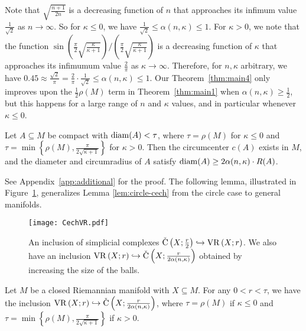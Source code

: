 \documentclass[11pt, reqno, english]{amsart}
\begin{document}
Note that $\sqrt{\tfrac{n+1}{2n}}$ is a decreasing function of $n$ that approaches its infimum value $\frac{1}{\sqrt{2}}$ as $n\to \infty$.
So for $\kappa\le 0$, we have $\frac{1}{\sqrt{2}}\le \alpha(n,\kappa)\le 1$.
For $\kappa> 0$, we note that the function $\sin\left(\tfrac{\pi}{2}\sqrt{\frac{\kappa}{\kappa+1}}\right)/\left(\tfrac{\pi}{2}\sqrt{\frac{\kappa}{\kappa+1}}\right)$ is a decreasing function of $\kappa$ that approaches its infimumum value $\frac{2}{\pi}$ as $\kappa\to\infty$.
Therefore, for $n,\kappa$ arbitrary, we have $0.45 \approx\frac{\sqrt{2}}{\pi}= \frac{2}{\pi}\cdot\frac{1}{\sqrt{2}} \le \alpha(n,\kappa)\le 1$.
Our Theorem~\ref{thm:main4} only improves upon the $\frac{1}{2}\rho(M)$ term in Theorem~\ref{thm:main1} when $\alpha(n,\kappa) \ge \frac{1}{2}$, but this happens for a large range of $n$ and $\kappa$ values, and in particular whenever $\kappa\le 0$.

\vspace{3mm}
\begin{lemma}[Circumradius]
\label{lem:circum}
Let $A\subseteq M$ be compact with $\mathrm{diam}(A)< \tau$, where $\tau=\rho(M)$ for $\kappa\le 0$ and $\tau=\min\left\{\rho(M),\tfrac{\pi}{2\sqrt{\kappa+1}}\right\}$ for $\kappa>0$.
Then the circumcenter $c(A)$ exists in $M$, and the diameter and circumradius of $A$ satisfy
$\mathrm{diam}(A)\geq2\alpha(n,\kappa)\cdot R(A)$.
\end{lemma}
\vspace{3mm}

See Appendix~\ref{app:additional} for the proof.
The following lemma, illustrated in Figure~\ref{fig:rips-cech-interleaving}, generalizes Lemma \ref{lem:circle-cech} from the circle case to general manifolds.

\begin{figure}[htb]
\centering
\texttt{[image: CechVR.pdf]}
\caption{An inclusion of simplicial complexes 
$\mathrm{\check{C}}\left(X;\frac{r}{2}\right)\hookrightarrow\mathrm{VR}\left(X;r\right)$.
We also have an inclusion $\mathrm{VR}\left(X;r\right)\hookrightarrow\mathrm{\check{C}}\left(X;\tfrac{r}{2\alpha(n,\kappa)}\right)$ obtained by increasing the size of the balls.
}
\label{fig:rips-cech-interleaving}
\end{figure}

\vspace{3mm}
\begin{lemma}
\label{lem:rips-cech}
Let $M$ be a closed Riemannian manifold with $X\subseteq M$. 
For any $0<r<\tau$, we have the inclusion $\mathrm{VR}\left(X;r\right) \hookrightarrow \mathrm{\check{C}}\left(X;\tfrac{r}{2\alpha(n,\kappa)}\right)$, where $\tau=\rho(M)$ if $\kappa \le 0$ and
$\tau=\min\left\{\rho(M),\tfrac{\pi}{2\sqrt{\kappa+1}}\right\}$ if $\kappa>0$.
\end{lemma}
\end{document}
